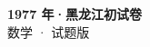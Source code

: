 \documentclass[zihao=-4, a4paper]{ctexart}
\begin{document}
\begin{center}
  {\Large\bfseries 1977 年·黑龙江初试卷}\\[4pt]
  {\large 数学 · 试题版}
\end{center}
\medskip
{}

\end{document}
